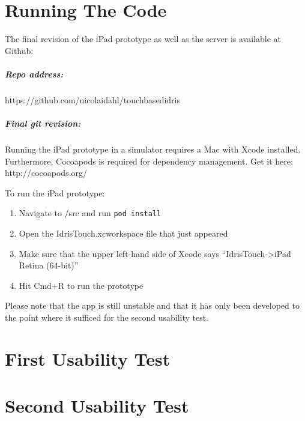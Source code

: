 \appendix
\label{Appendix}
\chapter{Running The Code}
\label{chap:RunningTheCode}
The final revision of the iPad prototype as well as the server is available at
Github: 
\paragraph{Repo address:} https://github.com/nicolaidahl/touchbasedidris
\paragraph{Final git revision:} 
\paragraph{}
Running the iPad prototype in a simulator requires a Mac with Xcode installed. Furthermore,
Cocoapods is required for dependency management. Get it here: http://cocoapods.org/

To run the iPad prototype: 
\begin{enumerate}
	\item Navigate to /src and run \texttt{pod install}
	\item Open the IdrisTouch.xcworkspace file that just appeared
	\item Make sure that the upper left-hand side of Xcode says ``IdrisTouch->iPad
	Retina (64-bit)''
	\item Hit Cmd+R to run the prototype
\end{enumerate}

Please note that the app is still unstable and that it has only been developed
to the point where it sufficed for the second usability test.


\chapter{First Usability Test}
\label{chap:FirstUsabilityTest}


\chapter{Second Usability Test}
\label{chap:SecondUsabilityTest}


